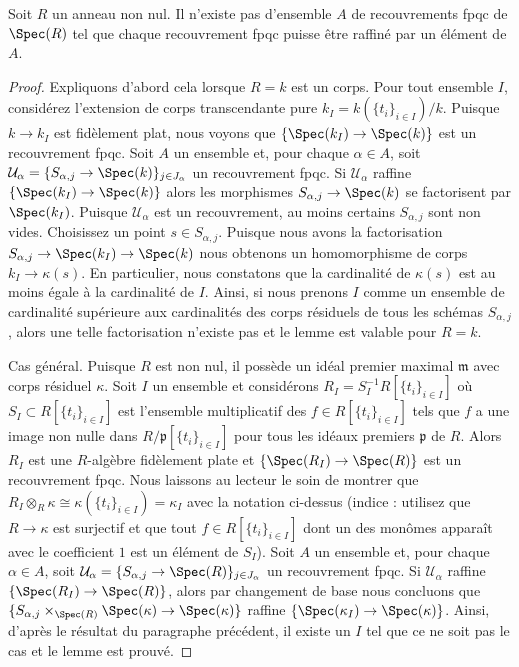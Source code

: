 \begin{lemma}
\label{lemma-no-set-of-fpqc-covers-is-initial}
Soit $R$ un anneau non nul. Il n'existe pas d'ensemble $A$ de recouvrements fpqc de $\Spec(R)$ tel que chaque recouvrement fpqc puisse être raffiné par un élément de $A$.
\end{lemma}

\begin{proof}
Expliquons d'abord cela lorsque $R = k$ est un corps. Pour tout ensemble $I$, considérez l'extension de corps transcendante pure $k_I = k(\{t_i\}_{i \in I})/k$. Puisque $k \to k_I$ est fidèlement plat, nous voyons que $\{\Spec(k_I) \to \Spec(k)\}$ est un recouvrement fpqc. Soit $A$ un ensemble et, pour chaque $\alpha \in A$, soit $\mathcal{U}_\alpha = \{S_{\alpha, j} \to \Spec(k)\}_{j \in J_\alpha}$ un recouvrement fpqc. Si $\mathcal{U}_\alpha$ raffine $\{\Spec(k_I) \to \Spec(k)\}$ alors les morphismes $S_{\alpha, j} \to \Spec(k)$ se factorisent par $\Spec(k_I)$. Puisque $\mathcal{U}_\alpha$ est un recouvrement, au moins certains $S_{\alpha, j}$ sont non vides. Choisissez un point $s \in S_{\alpha, j}$. Puisque nous avons la factorisation $S_{\alpha, j} \to \Spec(k_I) \to \Spec(k)$ nous obtenons un homomorphisme de corps $k_I \to \kappa(s)$. En particulier, nous constatons que la cardinalité de $\kappa(s)$ est au moins égale à la cardinalité de $I$. Ainsi, si nous prenons $I$ comme un ensemble de cardinalité supérieure aux cardinalités des corps résiduels de tous les schémas $S_{\alpha, j}$, alors une telle factorisation n'existe pas et le lemme est valable pour $R = k$.

\medskip\noindent
Cas général. Puisque $R$ est non nul, il possède un idéal premier maximal $\mathfrak m$ avec corps résiduel $\kappa$. Soit $I$ un ensemble et considérons $R_I = S_I^{-1} R[\{t_i\}_{i \in I}]$ où $S_I \subset R[\{t_i\}_{i \in I}]$ est l'ensemble multiplicatif des $f \in R[\{t_i\}_{i \in I}]$ tels que $f$ a une image non nulle dans $R/\mathfrak p[\{t_i\}_{i \in I}]$ pour tous les idéaux premiers $\mathfrak p$ de $R$. Alors $R_I$ est une $R$-algèbre fidèlement plate et $\{\Spec(R_I) \to \Spec(R)\}$ est un recouvrement fpqc. Nous laissons au lecteur le soin de montrer que $R_I \otimes_R \kappa \cong \kappa(\{t_i\}_{i \in I}) = \kappa_I$ avec la notation ci-dessus (indice : utilisez que $R \to \kappa$ est surjectif et que tout $f \in R[\{t_i\}_{i \in I}]$ dont un des monômes apparaît avec le coefficient $1$ est un élément de $S_I$). Soit $A$ un ensemble et, pour chaque $\alpha \in A$, soit $\mathcal{U}_\alpha = \{S_{\alpha, j} \to \Spec(R)\}_{j \in J_\alpha}$ un recouvrement fpqc. Si $\mathcal{U}_\alpha$ raffine $\{\Spec(R_I) \to \Spec(R)\}$, alors par changement de base nous concluons que $\{S_{\alpha, j} \times_{\Spec(R)} \Spec(\kappa) \to \Spec(\kappa)\}$ raffine $\{\Spec(\kappa_I) \to \Spec(\kappa)\}$. Ainsi, d'après le résultat du paragraphe précédent, il existe un $I$ tel que ce ne soit pas le cas et le lemme est prouvé.
\end{proof}













